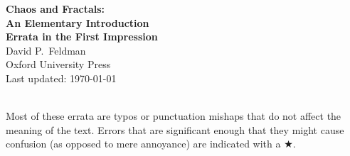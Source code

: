 \documentclass[12pt]{article}
\begin{document}
\pagestyle{empty}

\begin{center}

{\Large {\bf Chaos and Fractals:}}\\
\medskip
{\bf {\large An Elementary Introduction}}\\
\bigskip
{\bf {\LARGE Errata in the First Impression}}\\
\bigskip
{ {\large David P.~Feldman}}\\
\medskip
Oxford University Press\\
\smallskip
Last updated: \today
\end{center}
\hspace{2mm}\\

\noindent Most of these errata are typos or punctuation mishaps that
do not affect the meaning of the text.  Errors that are significant
enough that they might cause confusion (as opposed to mere annoyance)
are indicated with a $\bigstar$.\\ 

\end{document}

